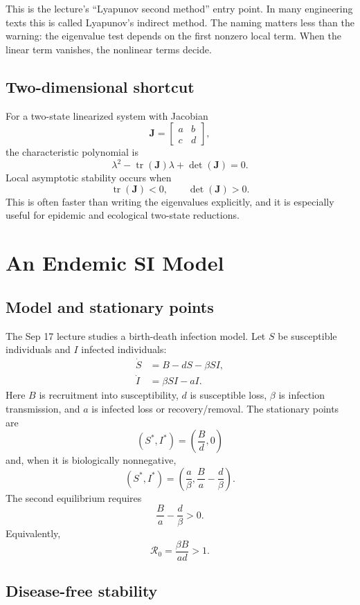 \documentclass[a4paper]{article}
\DeclareMathOperator{\tr}{tr}
\newcommand{\mat}[1]{\mathbf{#1}}
\newcommand{\J}{\mat J}
\newcommand{\Rzero}{\mathcal R_0}
\begin{document}
This is the lecture's ``Lyapunov second method'' entry point. In many engineering texts this is called Lyapunov's indirect method. The naming matters less than the warning: the eigenvalue test depends on the first nonzero local term. When the linear term vanishes, the nonlinear terms decide.

\subsection{Two-dimensional shortcut}

For a two-state linearized system with Jacobian
\[
  \J=
  \begin{bmatrix}
  a&b\\c&d
  \end{bmatrix},
\]
the characteristic polynomial is
\[
  \lambda^2-\tr(\J)\lambda+\det(\J)=0.
\]
Local asymptotic stability occurs when
\[
  \tr(\J)<0,\qquad \det(\J)>0.
\]
This is often faster than writing the eigenvalues explicitly, and it is especially useful for epidemic and ecological two-state reductions.

\section{An Endemic SI Model}

\subsection{Model and stationary points}

The Sep 17 lecture studies a birth-death infection model. Let \(S\) be susceptible individuals and \(I\) infected individuals:
\[
  \begin{aligned}
  \dot S &= B-dS-\beta SI,\\
  \dot I &= \beta SI-aI.
  \end{aligned}
\]
Here \(B\) is recruitment into susceptibility, \(d\) is susceptible loss, \(\beta\) is infection transmission, and \(a\) is infected loss or recovery/removal. The stationary points are
\[
  (S^\ast,I^\ast)=\left(\frac{B}{d},0\right)
\]
and, when it is biologically nonnegative,
\[
  (S^\ast,I^\ast)=
  \left(\frac{a}{\beta},\frac{B}{a}-\frac{d}{\beta}\right).
\]
The second equilibrium requires
\[
  \frac{B}{a}-\frac{d}{\beta}>0.
\]
Equivalently,
\[
  \Rzero=\frac{\beta B}{ad}>1.
\]

\subsection{Disease-free stability}
\end{document}

